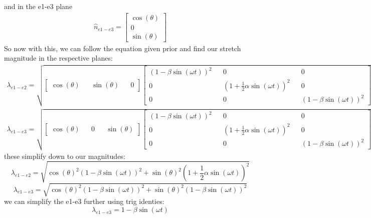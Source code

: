 and in the e1-e3 plane
\begin{gather}
\hat{n}_{e1-e3} = 
    \begin{bmatrix}
        \cos(\theta) \\
        0 \\
        \sin(\theta)
    \end{bmatrix}
\end{gather}
So now with this, we can follow the equation given prior and find our stretch magnitude in the respective planes:
\begin{gather}
    \lambda_{e1-e2} = 
    \sqrt{\begin{bmatrix}
        \cos(\theta) && \sin(\theta) && 0 
    \end{bmatrix}
    \begin{bmatrix}
         (1-\beta\sin(\omega t))^2 && 0 && 0\\
        0 && (1 + \frac{1}{2}\alpha\sin(\omega t))^2 && 0 \\
        0 && 0 && (1-\beta\sin(\omega t))^2
    \end{bmatrix}
     \begin{bmatrix}
        \cos(\theta) \\
        \sin(\theta) \\
        0
    \end{bmatrix}}
\end{gather}
\begin{gather}
    \lambda_{e1-e3} = 
    \sqrt{\begin{bmatrix}
        \cos(\theta) && 0&& \sin(\theta)  
    \end{bmatrix}
    \begin{bmatrix}
         (1-\beta\sin(\omega t))^2 && 0 && 0\\
        0 && (1 + \frac{1}{2}\alpha\sin(\omega t))^2 && 0 \\
        0 && 0 && (1-\beta\sin(\omega t))^2
    \end{bmatrix}
     \begin{bmatrix}
        \cos(\theta) \\
        0\\
        \sin(\theta) \\
    \end{bmatrix}}
\end{gather}
these simplify down to our magnitudes:
\begin{equation}
     \boxed{\lambda_{e1-e2} = \sqrt{\cos(\theta)^2(1-\beta\sin(\omega t))^2+\sin(\theta)^2(1 + \frac{1}{2}\alpha\sin(\omega t))^2}}
\end{equation}
\begin{equation}
     \lambda_{e1-e3} = \sqrt{\cos(\theta)^2(1-\beta\sin(\omega t))^2+\sin(\theta)^2(1-\beta\sin(\omega t))^2}
\end{equation}
we can simplify the e1-e3 further using trig identies:
\begin{equation}
    \boxed{\lambda_{e1-e3} = 1-\beta\sin(\omega t)}
\end{equation}

